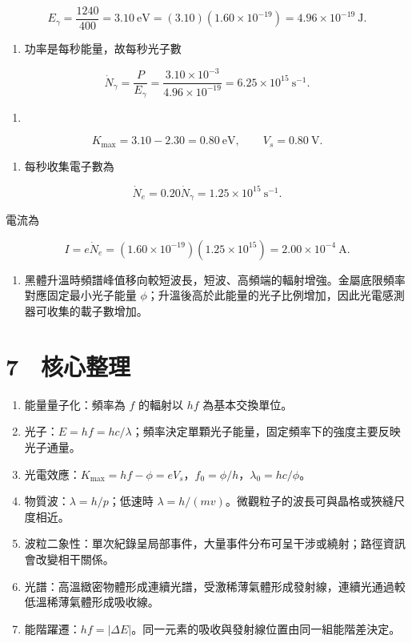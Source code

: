 \documentclass[11pt,a4paper]{article}
\providecommand{\tightlist}{%
  \setlength{\itemsep}{0pt}\setlength{\parskip}{0pt}}
\begin{document}
\[
E_\gamma=\frac{1240}{400}=3.10\ \mathrm{eV}
=(3.10)(1.60\times10^{-19})
=4.96\times10^{-19}\ \mathrm J.
\]

\begin{enumerate}
\def\labelenumi{(\arabic{enumi})}
\setcounter{enumi}{1}
\tightlist
\item
  功率是每秒能量，故每秒光子數
\end{enumerate}

\[
\dot N_\gamma=\frac{P}{E_\gamma}
=\frac{3.10\times10^{-3}}{4.96\times10^{-19}}
=6.25\times10^{15}\ \mathrm{s^{-1}}.
\]

\begin{enumerate}
\def\labelenumi{(\arabic{enumi})}
\setcounter{enumi}{2}
\tightlist
\item
\end{enumerate}

\[
K_{\max}=3.10-2.30=0.80\ \mathrm{eV},
\qquad
V_s=0.80\ \mathrm V.
\]

\begin{enumerate}
\def\labelenumi{(\arabic{enumi})}
\setcounter{enumi}{3}
\tightlist
\item
  每秒收集電子數為
\end{enumerate}

\[
\dot N_e=0.20\dot N_\gamma
=1.25\times10^{15}\ \mathrm{s^{-1}}.
\]

電流為

\[
I=e\dot N_e
=(1.60\times10^{-19})(1.25\times10^{15})
=2.00\times10^{-4}\ \mathrm A.
\]

\begin{enumerate}
\def\labelenumi{(\arabic{enumi})}
\setcounter{enumi}{4}
\tightlist
\item
  黑體升溫時頻譜峰值移向較短波長，短波、高頻端的輻射增強。金屬底限頻率對應固定最小光子能量 \(\phi\)；升溫後高於此能量的光子比例增加，因此光電感測器可收集的載子數增加。
\end{enumerate}

\section{7　核心整理}\label{ux6838ux5fc3ux6574ux7406}

\begin{enumerate}
\def\labelenumi{\arabic{enumi}.}
\tightlist
\item
  能量量子化：頻率為 \(f\) 的輻射以 \(hf\) 為基本交換單位。
\item
  光子：\(E=hf=hc/\lambda\)；頻率決定單顆光子能量，固定頻率下的強度主要反映光子通量。
\item
  光電效應：\(K_{\max}=hf-\phi=eV_s\)，\(f_0=\phi/h\)，\(\lambda_0=hc/\phi\)。
\item
  物質波：\(\lambda=h/p\)；低速時 \(\lambda=h/(mv)\)。微觀粒子的波長可與晶格或狹縫尺度相近。
\item
  波粒二象性：單次紀錄呈局部事件，大量事件分布可呈干涉或繞射；路徑資訊會改變相干關係。
\item
  光譜：高溫緻密物體形成連續光譜，受激稀薄氣體形成發射線，連續光通過較低溫稀薄氣體形成吸收線。
\item
  能階躍遷：\(hf=\lvert\Delta E\rvert\)。同一元素的吸收與發射線位置由同一組能階差決定。
\end{enumerate}
\end{document}
